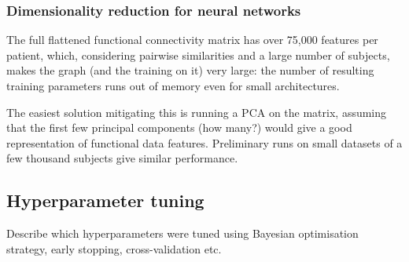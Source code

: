 \subsubsection{Dimensionality reduction for neural networks}
The full flattened functional connectivity matrix has over 75,000 features per patient, which, considering pairwise similarities and a large number of subjects, makes the graph (and the training on it) very large: the number of resulting training parameters runs out of memory even for small architectures.

The easiest solution mitigating this is running a PCA on the matrix, assuming that the first few principal components (how many?) would give a good representation of functional data features. Preliminary runs on small datasets of a few thousand subjects give similar performance.



\subsection{Hyperparameter tuning}
Describe which hyperparameters were tuned using Bayesian optimisation strategy, early stopping, cross-validation etc.




